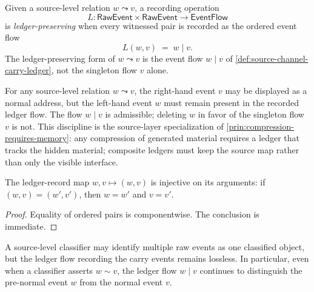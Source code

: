 \begin{definition}
\label{def:source-channel-ledger-preserving}
Given a source-level relation $w \leadsto v$, a recording operation
$$
  L \colon \mathsf{RawEvent} \times \mathsf{RawEvent} \longrightarrow \mathsf{EventFlow}
$$
is \emph{ledger-preserving} when every witnessed pair is recorded as the ordered event flow
$$
  L(w, v) \;=\; w \mid v.
$$
The ledger-preserving form of $w \leadsto v$ is the event flow $w \mid v$ of \autoref{def:source-channel-carry-ledger}, not the singleton flow $v$ alone.
\end{definition}

\begin{principle}
\label{prin:source-channel-no-raw-erasure}
For any source-level relation $w \leadsto v$, the right-hand event $v$ may be displayed as a normal address, but the left-hand event $w$ must remain present in the recorded ledger flow. The flow $w \mid v$ is admissible; deleting $w$ in favor of the singleton flow $v$ is not. This discipline is the source-layer specialization of \autoref{prin:compression-requires-memory}: any compression of generated material requires a ledger that tracks the hidden material; composite ledgers must keep the source map rather than only the visible interface.
\end{principle}

\begin{proposition}
\label{prop:source-channel-ledger-injective}
The ledger-record map $w, v \mapsto (w, v)$ is injective on its arguments: if $(w, v) = (w', v')$, then $w = w'$ and $v = v'$.
\end{proposition}

\begin{proof}
Equality of ordered pairs is componentwise. The conclusion is immediate.
\end{proof}

\begin{corollary}
\label{cor:source-channel-quotient-vs-ledger}
A source-level classifier may identify multiple raw events as one classified object, but the ledger flow recording the carry events remains lossless. In particular, even when a classifier asserts $w \sim v$, the ledger flow $w \mid v$ continues to distinguish the pre-normal event $w$ from the normal event $v$.
\end{corollary}

